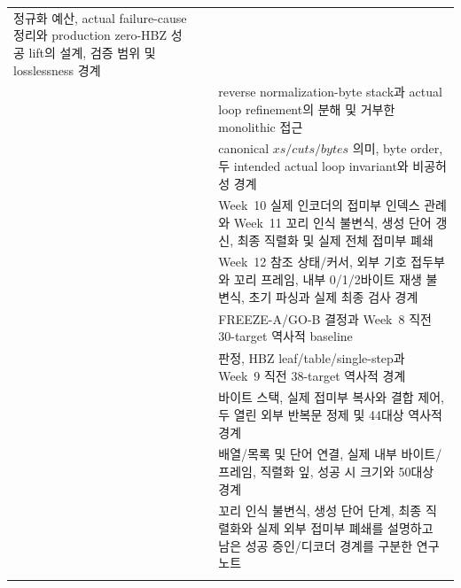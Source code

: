 \begin{longtable}{L{0.29\textwidth}L{0.31\textwidth}L{0.32\textwidth}}
정규화 예산, actual failure-cause 정리와 production zero-HBZ 성공 lift의 설계,
검증 범위 및 losslessness 경계 \\
 &  & reverse
normalization-byte stack과 actual loop refinement의 분해 및 거부한 monolithic
접근 \\
\newline{} &
\newline{} & canonical
\(xs/cuts/bytes\) 의미, byte order, 두 intended actual loop invariant와 비공허성
경계 \\
\newline{} &
\newline{} & Week~10 실제
인코더의 접미부 인덱스 관례와 Week~11 꼬리 인식 불변식, 생성 단어 갱신,
최종 직렬화 및 실제 전체 접미부 폐쇄 \\
\newline{} &
\newline{} & Week~12 참조
상태/커서, 외부 기호 접두부와 꼬리 프레임, 내부 0/1/2바이트 재생 불변식,
초기 파싱과 실제 최종 검사 경계 \\
 &  & FREEZE-A/GO-B 결정과 Week~8
직전 30-target 역사적 baseline \\
 &  & 
판정, HBZ leaf/table/single-step과 Week~9 직전 38-target 역사적 경계 \\
 &  & 바이트 스택, 실제 접미부
복사와 결합 제어, 두 열린 외부 반복문 정제 및 44대상 역사적 경계 \\
 &  & 배열/목록 및 단어 연결,
실제 내부 바이트/프레임, 직렬화 잎, 성공 시 크기와 50대상
 경계 \\
 &
\newline
{}\newline
{} & 꼬리 인식
불변식, 생성 단어 단계, 최종 직렬화와 실제 외부 접미부 폐쇄를 설명하고 남은
성공 증인/디코더 경계를 구분한 연구 노트 \\
 &  &

\end{longtable}
